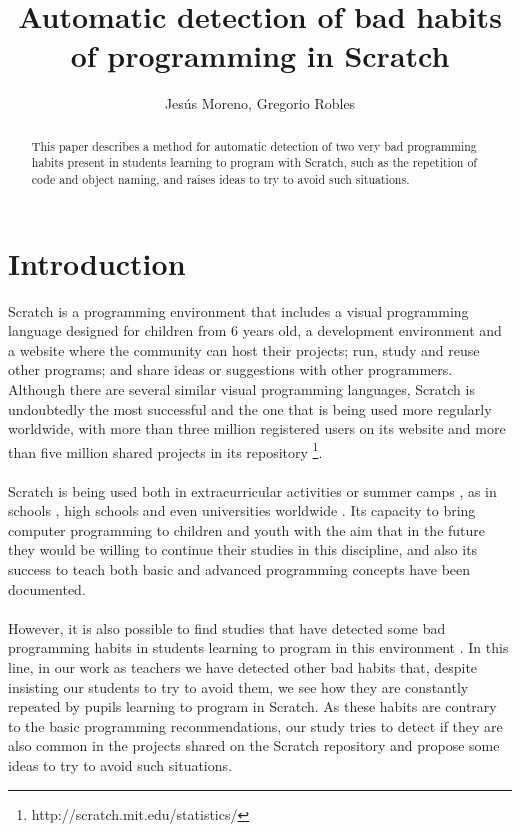 \documentclass[a4paper,10pt]{article}
\title{Automatic detection of bad habits of programming in Scratch}
\author{Jesús Moreno, Gregorio Robles}
\begin{document}
\maketitle

\begin{abstract}
This paper describes a method for automatic detection of two very bad programming habits present in students learning to program with Scratch, such as the repetition of code and object naming, and raises ideas to try to avoid such situations.

\end{abstract}

\section{Introduction}
Scratch \cite{resnick2009scratch}  is a programming environment that includes a visual programming language designed for children from 6 years old, a development environment and a website where the community can host their projects; run, study and reuse other programs; and share ideas or suggestions with other programmers. Although there are several similar visual programming languages, Scratch is undoubtedly the most successful and the one that is being used more regularly worldwide, with more than three million registered users on its website and more than five million shared projects in its repository \footnote{http://scratch.mit.edu/statistics/}.
\paragraph{}Scratch is being used both in extracurricular activities \cite{maloney2008programming, kafai2010entering} or summer camps \cite{adams2010scratching, franklin2013assessment}, as in schools \cite{wilson2012evaluation}, high schools \cite{meerbaum2013learning} and even universities worldwide \cite{wolz2009starting, malan2007scratch}. Its capacity to bring computer programming to children and youth with the aim that in the future they would be willing to continue their studies in this discipline, and also its success to teach both basic and advanced programming concepts have been documented.
\paragraph{}However, it is also possible to find studies that have detected some bad programming habits in students learning to program in this environment \cite{meerbaum2011habits}. In this line, in our work as teachers we have detected other bad habits that, despite insisting our students to try to avoid them, we see how they are constantly repeated by pupils learning to program in Scratch. As these habits are contrary to the basic programming recommendations, our study tries to detect if they are also common in the projects shared on the Scratch repository and propose some ideas to try to avoid such situations.
\end{document}
